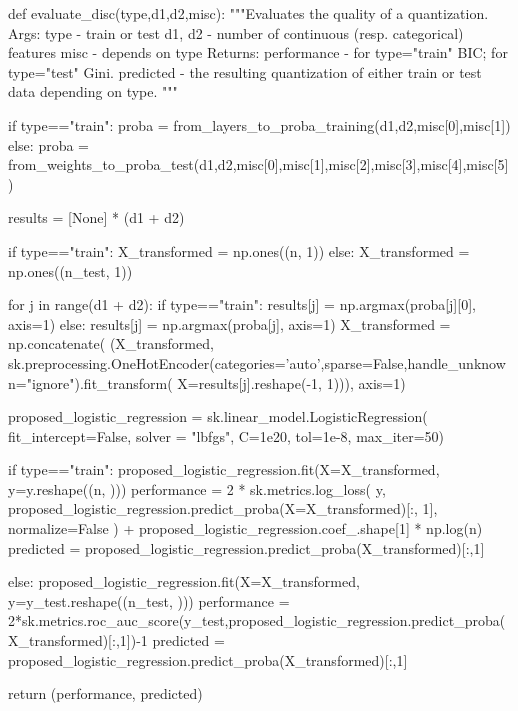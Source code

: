 \begin{pylisting}
    
    def evaluate_disc(type,d1,d2,misc):
        """Evaluates the quality of a quantization.
	    Args:
	       type - train or test
	       d1, d2 - number of continuous (resp. categorical) features
	       misc - depends on type
	    Returns:
		  performance - for type="train" BIC; for type="test" Gini.
		  predicted - the resulting quantization of either train or test data depending on type.
	    """

        if type=="train":
            proba = from_layers_to_proba_training(d1,d2,misc[0],misc[1])
        else:
            proba = from_weights_to_proba_test(d1,d2,misc[0],misc[1],misc[2],misc[3],misc[4],misc[5])


        results = [None] * (d1 + d2)

        if type=="train":
            X_transformed = np.ones((n, 1))
        else:
            X_transformed = np.ones((n_test, 1))

        for j in range(d1 + d2):
            if type=="train":
                results[j] = np.argmax(proba[j][0], axis=1)
            else:
                results[j] = np.argmax(proba[j], axis=1)
            X_transformed = np.concatenate(
                (X_transformed, sk.preprocessing.OneHotEncoder(categories='auto',sparse=False,handle_unknown="ignore").fit_transform(
                    X=results[j].reshape(-1, 1))),
                axis=1)

        proposed_logistic_regression = sk.linear_model.LogisticRegression(
            fit_intercept=False, solver = "lbfgs", C=1e20, tol=1e-8, max_iter=50)


        if type=="train":
            proposed_logistic_regression.fit(X=X_transformed, y=y.reshape((n, )))
            performance = 2 * sk.metrics.log_loss(
              y,
              proposed_logistic_regression.predict_proba(X=X_transformed)[:, 1],
              normalize=False
          ) + proposed_logistic_regression.coef_.shape[1] * np.log(n)
            predicted = proposed_logistic_regression.predict_proba(X_transformed)[:,1]

        else:
            proposed_logistic_regression.fit(X=X_transformed, y=y_test.reshape((n_test, )))
            performance = 2*sk.metrics.roc_auc_score(y_test,proposed_logistic_regression.predict_proba(X_transformed)[:,1])-1
            predicted = proposed_logistic_regression.predict_proba(X_transformed)[:,1]

        return (performance, predicted)



\end{pylisting}
